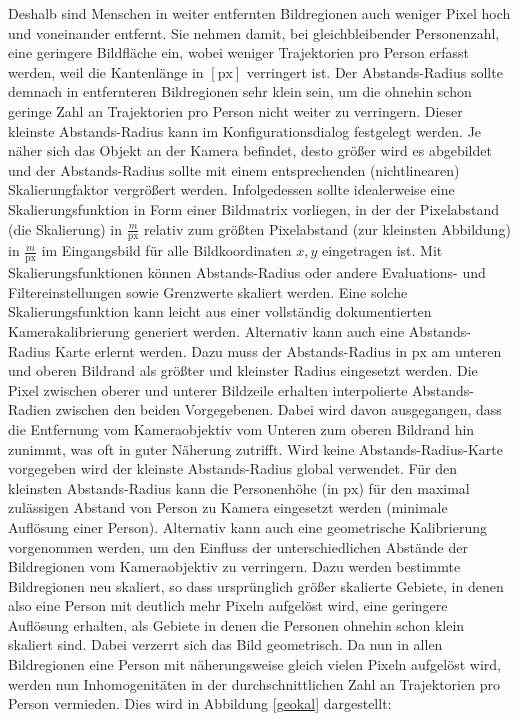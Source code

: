 Deshalb sind Menschen in weiter entfernten Bildregionen auch weniger Pixel hoch und voneinander entfernt. Sie nehmen damit, bei gleichbleibender Personenzahl, eine geringere Bildfläche ein, wobei weniger Trajektorien pro Person erfasst werden, weil die Kantenlänge in $[\text{px}]$ verringert ist. Der Abstands-Radius sollte demnach in entfernteren Bildregionen sehr klein sein, um die ohnehin schon geringe Zahl an Trajektorien pro Person nicht weiter zu verringern. Dieser kleinste Abstands-Radius kann im Konfigurationsdialog festgelegt werden. Je näher sich das Objekt an der Kamera befindet, desto größer wird es abgebildet und der Abstands-Radius sollte mit einem entsprechenden (nichtlinearen) Skalierungfaktor vergrößert werden. Infolgedessen sollte idealerweise eine Skalierungsfunktion in Form einer Bildmatrix vorliegen, in der der Pixelabstand (die Skalierung) in $\frac{m}{\text{px}}$ relativ zum größten Pixelabstand (zur kleinsten Abbildung) in $\frac{m}{\text{px}}$ im Eingangsbild für alle Bildkoordinaten $x,y$ eingetragen ist. Mit Skalierungsfunktionen können Abstands-Radius oder andere Evaluations- und Filtereinstellungen sowie Grenzwerte skaliert werden. Eine solche Skalierungsfunktion kann leicht aus einer vollständig dokumentierten Kamerakalibrierung generiert werden. Alternativ kann auch eine Abstands-Radius Karte erlernt werden. Dazu muss der Abstands-Radius in $\text{px}$ am unteren und oberen Bildrand als größter und kleinster Radius eingesetzt werden. Die Pixel zwischen oberer und unterer Bildzeile erhalten interpolierte Abstands-Radien zwischen den beiden Vorgegebenen. Dabei wird davon ausgegangen, dass die Entfernung vom Kameraobjektiv vom Unteren zum oberen Bildrand hin zunimmt, was oft in guter Näherung zutrifft. Wird keine Abstands-Radius-Karte vorgegeben wird der kleinste Abstands-Radius global verwendet. Für den kleinsten Abstands-Radius kann die Personenhöhe (in $\text{px}$) für den maximal zulässigen Abstand von Person zu Kamera eingesetzt werden (minimale Auflösung einer Person).
\newpage
Alternativ kann auch eine geometrische Kalibrierung vorgenommen werden, um den Einfluss der unterschiedlichen Abstände der Bildregionen vom Kameraobjektiv zu verringern. Dazu werden bestimmte Bildregionen neu skaliert, so dass ursprünglich größer skalierte Gebiete, in denen also eine Person mit deutlich mehr Pixeln aufgelöst wird, eine geringere Auflösung erhalten, als Gebiete in denen die Personen ohnehin schon klein skaliert sind. Dabei verzerrt sich das Bild geometrisch. Da nun in allen Bildregionen eine Person mit näherungsweise gleich vielen Pixeln aufgelöst wird, werden nun Inhomogenitäten in der durchschnittlichen Zahl an Trajektorien pro Person vermieden. Dies wird in Abbildung \ref{geokal} dargestellt:


